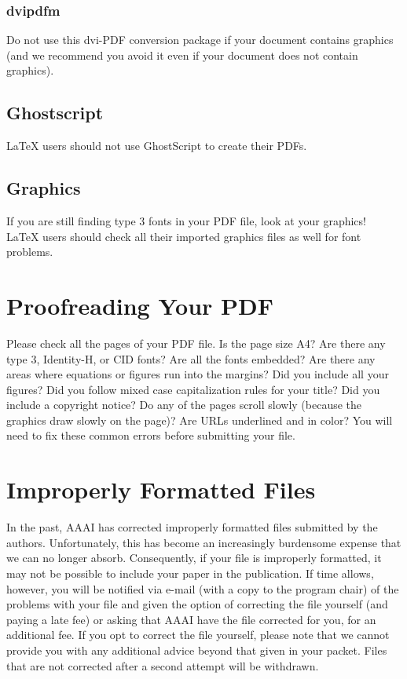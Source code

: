 \documentclass[letterpaper]{article}
\begin{document}
\subsubsection{dvipdfm}
Do not use this dvi-PDF conversion package if your document contains graphics (and we recommend you avoid it even if your document does not contain graphics).

\subsection{Ghostscript}
\LaTeX{} users should not use GhostScript to create their PDFs.

\subsection{Graphics}
If you are still finding type 3 fonts in your PDF file, look at your graphics! \LaTeX{} users should check all their imported graphics files as well for font problems.

\section{Proofreading Your PDF}
Please check all the pages of your PDF file. Is the page size A4? Are there any type 3, Identity-H, or CID fonts? Are all the fonts embedded? Are there any areas where equations or figures run into the margins? Did you include all your figures? Did you follow mixed case capitalization rules for your title? Did you include a copyright notice? Do any of the pages scroll slowly (because the graphics draw slowly on the page)? Are URLs underlined and in color? You will need to fix these common errors before submitting your file. 

\section{Improperly Formatted Files }
In the past, AAAI has corrected improperly formatted files submitted by the authors. Unfortunately, this has become an increasingly burdensome expense that we can no longer absorb. Consequently, if your file is improperly formatted, it may not be possible to include your paper in the publication. If time allows, however, you will be notified via e-mail (with a copy to the program chair) of the problems with your file and given the option of correcting the file yourself (and paying a late fee) or asking that AAAI have the file corrected for you, for an additional fee. If you opt to correct the file yourself, please note that we cannot provide you with any additional advice beyond that given in your packet. Files that are not corrected after a second attempt will be withdrawn.
\end{document}
